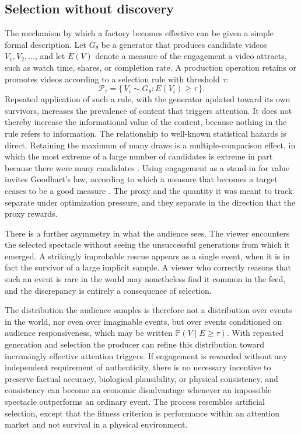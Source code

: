 \documentclass[12pt]{article}
\theoremstyle{plain}
\theoremstyle{definition}
\theoremstyle{remark}
\renewcommand{\Pr}{\mathbb{P}}
\begin{document}
\subsection{Selection without discovery}

The mechanism by which a factory becomes effective can be given a simple formal description. Let $G_\theta$ be a generator that produces candidate videos $V_1, V_2, \dots$, and let $E(V)$ denote a measure of the engagement a video attracts, such as watch time, shares, or completion rate. A production operation retains or promotes videos according to a selection rule with threshold $\tau$:
\[
\mathcal{P}_\tau = \{\, V_i \sim G_\theta : E(V_i) \ge \tau \,\}.
\]
Repeated application of such a rule, with the generator updated toward its own survivors, increases the prevalence of content that triggers attention. It does not thereby increase the informational value of the content, because nothing in the rule refers to information. The relationship to well-known statistical hazards is direct. Retaining the maximum of many draws is a multiple-comparison effect, in which the most extreme of a large number of candidates is extreme in part because there were many candidates \cite{benjamini1995}. Using engagement as a stand-in for value invites Goodhart's law, according to which a measure that becomes a target ceases to be a good measure \cite{goodhart1975,strathern1997,manheim2018}. The proxy and the quantity it was meant to track separate under optimization pressure, and they separate in the direction that the proxy rewards.

There is a further asymmetry in what the audience sees. The viewer encounters the selected spectacle without seeing the unsuccessful generations from which it emerged. A strikingly improbable rescue appears as a single event, when it is in fact the survivor of a large implicit sample. A viewer who correctly reasons that such an event is rare in the world may nonetheless find it common in the feed, and the discrepancy is entirely a consequence of selection.

The distribution the audience samples is therefore not a distribution over events in the world, nor even over imaginable events, but over events conditioned on audience responsiveness, which may be written $\Pr(V \mid E \ge \tau)$. With repeated generation and selection the producer can refine this distribution toward increasingly effective attention triggers. If engagement is rewarded without any independent requirement of authenticity, there is no necessary incentive to preserve factual accuracy, biological plausibility, or physical consistency, and consistency can become an economic disadvantage whenever an impossible spectacle outperforms an ordinary event. The process resembles artificial selection, except that the fitness criterion is performance within an attention market and not survival in a physical environment.
\end{document}
